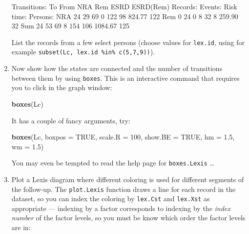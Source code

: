 \documentclass[
]{book}
\newenvironment{Shaded}{\begin{snugshade}}{\end{snugshade}}
\newcommand{\AttributeTok}[1]{\textcolor[rgb]{0.13,0.29,0.53}{#1}}
\newcommand{\ConstantTok}[1]{\textcolor[rgb]{0.56,0.35,0.01}{#1}}
\newcommand{\DecValTok}[1]{\textcolor[rgb]{0.00,0.00,0.81}{#1}}
\newcommand{\FloatTok}[1]{\textcolor[rgb]{0.00,0.00,0.81}{#1}}
\newcommand{\FunctionTok}[1]{\textcolor[rgb]{0.13,0.29,0.53}{\textbf{#1}}}
\newcommand{\NormalTok}[1]{#1}
\begin{document}
\begin{enumerate}
\begin{Shaded}
\begin{Highlighting}[]

\NormalTok{Transitions:}
\NormalTok{     To}
\NormalTok{From  NRA Rem ESRD ESRD(Rem)  Records:  Events: Risk time:  Persons:}
\NormalTok{  NRA  24  29   69         0       122       98     824.77       122}
\NormalTok{  Rem   0  24    0         8        32        8     259.90        32}
\NormalTok{  Sum  24  53   69         8       154      106    1084.67       125}
\end{Highlighting}
\end{Shaded}

  List the records from a few select persons (choose values for
  \texttt{lex.id}, using for example \texttt{subset(Lc,\ lex.id\ \%in\%\ c(5,7,9))}).
\item
  Now show how the states are connected and the number of transitions
  between them by using \texttt{boxes}. This is an interactive command
  that requires you to click in the graph window:

\begin{Shaded}
\begin{Highlighting}[]
\FunctionTok{boxes}\NormalTok{(Lc)}
\end{Highlighting}
\end{Shaded}

  It has a couple of fancy arguments, try:

\begin{Shaded}
\begin{Highlighting}[]
\FunctionTok{boxes}\NormalTok{(Lc, }\AttributeTok{boxpos =} \ConstantTok{TRUE}\NormalTok{, }\AttributeTok{scale.R =} \DecValTok{100}\NormalTok{, }\AttributeTok{show.BE =} \ConstantTok{TRUE}\NormalTok{, }\AttributeTok{hm =} \FloatTok{1.5}\NormalTok{, }\AttributeTok{wm =} \FloatTok{1.5}\NormalTok{)}
\end{Highlighting}
\end{Shaded}

  You may even be tempted to read the help page for
  \texttt{boxes.Lexis} \ldots{}
\item
  Plot a Lexis diagram where different coloring is
  used for different segments of the follow-up. The
  \texttt{plot.Lexis} function draws a line for each record in the
  dataset, so you can index the coloring by \texttt{lex.Cst} and
  \texttt{lex.Xst} as appropriate --- indexing by a factor corresponds
  to indexing by the \emph{index number} of the factor levels, so you
  must be know which order the factor levels are in:


\end{enumerate}
\end{document}
